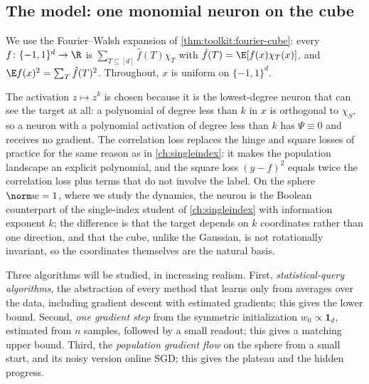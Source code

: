 \begin{refsection}
\section{The model: one monomial neuron on the cube}\label{sec:parity:model}

We use the Fourier--Walsh expansion of \cref{thm:toolkit:fourier-cube}: every $f\colon\{-1,1\}^d\to\R$ is $\sum_{T\subseteq[d]}\hat f(T)\chi_T$ with $\hat f(T)=\E[f(x)\chi_T(x)]$, and $\E f(x)^2=\sum_T\hat f(T)^2$. Throughout, $x$ is uniform on $\{-1,1\}^d$.


The activation $z\mapsto z^k$ is chosen because it is the lowest-degree neuron that can see the target at all: a polynomial of degree less than $k$ in $x$ is orthogonal to $\chi_S$, so a neuron with a polynomial activation of degree less than $k$ has $\Psi\equiv0$ and receives no gradient. The correlation loss replaces the hinge and square losses of practice for the same reason as in \cref{ch:singleindex}: it makes the population landscape an explicit polynomial, and the square loss $(y-f)^2$ equals twice the correlation loss plus terms that do not involve the label. On the sphere $\norm w=1$, where we study the dynamics, the neuron is the Boolean counterpart of the single-index student of \cref{ch:singleindex} with information exponent $k$; the difference is that the target depends on $k$ coordinates rather than one direction, and that the cube, unlike the Gaussian, is not rotationally invariant, so the coordinates themselves are the natural basis.

Three algorithms will be studied, in increasing realism. First, \emph{statistical-query algorithms}, the abstraction of every method that learns only from averages over the data, including gradient descent with estimated gradients; this gives the lower bound. Second, \emph{one gradient step} from the symmetric initialization $w_0\propto\mathbf 1_d$, estimated from $n$ samples, followed by a small readout; this gives a matching upper bound. Third, the \emph{population gradient flow} on the sphere from a small start, and its noisy version online SGD; this gives the plateau and the hidden progress.


\end{refsection}
